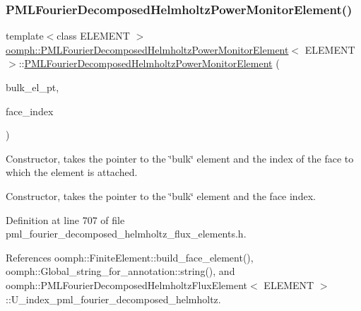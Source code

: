 \subsubsection{\texorpdfstring{P\+M\+L\+Fourier\+Decomposed\+Helmholtz\+Power\+Monitor\+Element()}{PMLFourierDecomposedHelmholtzPowerMonitorElement()}\hspace{0.1cm}{\footnotesize\ttfamily [1/3]}}
{\footnotesize\ttfamily template$<$class E\+L\+E\+M\+E\+NT $>$ \\
\hyperlink{classoomph_1_1PMLFourierDecomposedHelmholtzPowerMonitorElement}{oomph\+::\+P\+M\+L\+Fourier\+Decomposed\+Helmholtz\+Power\+Monitor\+Element}$<$ E\+L\+E\+M\+E\+NT $>$\+::\hyperlink{classoomph_1_1PMLFourierDecomposedHelmholtzPowerMonitorElement}{P\+M\+L\+Fourier\+Decomposed\+Helmholtz\+Power\+Monitor\+Element} (\begin{DoxyParamCaption}\item[{\hyperlink{classoomph_1_1FiniteElement}{Finite\+Element} $\ast$const \&}]{bulk\+\_\+el\+\_\+pt,  }\item[{const int \&}]{face\+\_\+index }\end{DoxyParamCaption})}



Constructor, takes the pointer to the \char`\"{}bulk\char`\"{} element and the index of the face to which the element is attached. 

Constructor, takes the pointer to the \char`\"{}bulk\char`\"{} element and the face index. 

Definition at line 707 of file pml\+\_\+fourier\+\_\+decomposed\+\_\+helmholtz\+\_\+flux\+\_\+elements.\+h.



References oomph\+::\+Finite\+Element\+::build\+\_\+face\+\_\+element(), oomph\+::\+Global\+\_\+string\+\_\+for\+\_\+annotation\+::string(), and oomph\+::\+P\+M\+L\+Fourier\+Decomposed\+Helmholtz\+Flux\+Element$<$ E\+L\+E\+M\+E\+N\+T $>$\+::\+U\+\_\+index\+\_\+pml\+\_\+fourier\+\_\+decomposed\+\_\+helmholtz.

\mbox{\label{classoomph_1_1PMLFourierDecomposedHelmholtzPowerMonitorElement_a21abbcb51942dec4b8458c31045dc644}} 
